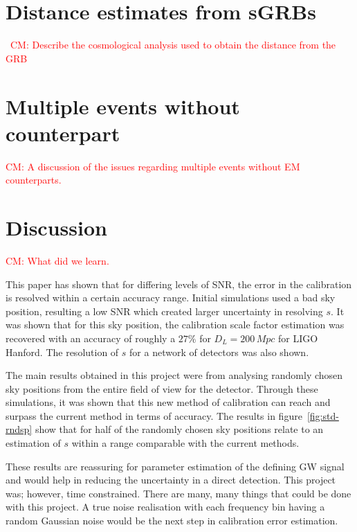 \documentclass[12pt]{iopart}
\newcommand{\cm}[1]{\textcolor{red}{CM: #1}}
\begin{document}
\section{Distance estimates from \acp{sGRB}\label{sec:cosmo}}

~\cm{Describe the cosmological analysis used to obtain the distance from the
GRB}

\section{Multiple events without counterpart\label{sec:multiple}}

\cm{A discussion of the issues regarding multiple events
without EM counterparts.}

\section{Discussion\label{sec:discussion}}

\cm{What did we learn.}

This paper has shown that for differing levels of SNR, the error in the
calibration is resolved within a certain accuracy range. Initial simulations
used a bad sky position, resulting a low SNR which created larger uncertainty
in resolving $s$. It was shown that for this sky position, the calibration
scale factor estimation was recovered with an accuracy of roughly a $27\%$ for
$D_{L} = 200\,Mpc$ for LIGO Hanford. The resolution of $s$ for a network of
detectors was also shown.

The main results obtained in this project were from analysing randomly chosen
sky positions from the entire field of view for the detector. Through these
simulations, it was shown that this new method of calibration can reach and
surpass the current method in terms of accuracy. The results in
figure~\ref{fig:std-rndsp} show that for half of the randomly chosen sky
positions relate to an estimation of $s$ within a range comparable with the
current methods.

These results are reassuring for parameter estimation of the defining GW signal
and would help in reducing the uncertainty in a direct detection. This project
was; however, time constrained. There are many, many things that could be done
with this project. A true noise realisation with each frequency bin having a
random Gaussian noise would be the next step in calibration error estimation.
\end{document}
